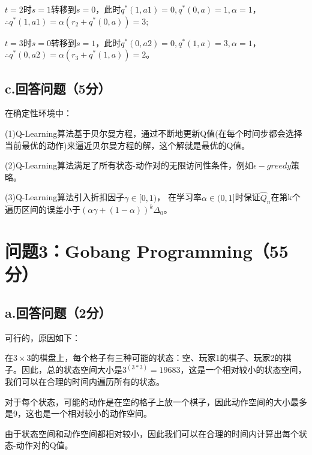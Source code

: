 \documentclass{article}
\begin{document}
$t = 2$时$s=1$转移到$s=0$，此时$q^*(1, a1)=0,q^*(0, a)=1,\alpha=1$，$\therefore q^*(1, a1) = \alpha(r_2 +q^*(0, a))=3$;

$t = 3$时$s=0$转移到$s=1$，此时$q^*(0, a2)=0,q^*(1, a)=3,\alpha=1$，$\therefore q^*(0, a2) = \alpha(r_3+q^*(1, a))=2$。
\subsection*{c.回答问题（5分）}
在确定性环境中：

(1)Q-Learning算法基于贝尔曼方程，通过不断地更新Q值(在每个时间步都会选择当前最优的动作)来逼近贝尔曼方程的解，这个解就是最优的Q值。

(2)Q-Learning算法满足了所有状态-动作对的无限访问性条件，例如$\epsilon-greedy$策略。

(3)Q-Learning算法引入折扣因子$\gamma \in [0,1)$，
在学习率$\alpha \in (0,1]$时保证$\hat{Q}_n$在第k个遍历区间的误差小于$(\alpha\gamma+(1-\alpha))^k\Delta_0$。
\section*{问题3：Gobang Programming（55分）}
\subsection*{a.回答问题（2分）}
可行的，原因如下：

在$3\times3$的棋盘上，每个格子有三种可能的状态：空、玩家1的棋子、玩家2的棋子。因此，总的状态空间大小是$3^{(3*3)}=19683$，这是一个相对较小的状态空间，我们可以在合理的时间内遍历所有的状态。

对于每个状态，可能的动作是在空的格子上放一个棋子，因此动作空间的大小最多是9，这也是一个相对较小的动作空间。

由于状态空间和动作空间都相对较小，因此我们可以在合理的时间内计算出每个状态-动作对的Q值。
\end{document}
